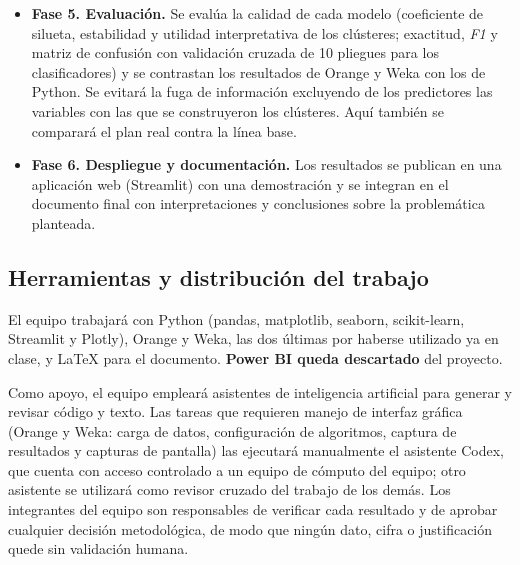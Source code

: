\documentclass[letterpaper,11pt]{article}
\begin{document}
\begin{itemize}
  \item \textbf{Fase 5. Evaluación.} Se evalúa la calidad de cada modelo (coeficiente de silueta, estabilidad y utilidad interpretativa de los clústeres; exactitud, \textit{F1} y matriz de confusión con validación cruzada de 10 pliegues para los clasificadores) y se contrastan los resultados de Orange y Weka con los de Python. Se evitará la fuga de información excluyendo de los predictores las variables con las que se construyeron los clústeres. Aquí también se comparará el plan real contra la línea base.
  \item \textbf{Fase 6. Despliegue y documentación.} Los resultados se publican en una aplicación web (Streamlit) con una demostración y se integran en el documento final con interpretaciones y conclusiones sobre la problemática planteada.
\end{itemize}

\subsection*{Herramientas y distribución del trabajo}

El equipo trabajará con Python (pandas, matplotlib, seaborn, scikit-learn, Streamlit y Plotly), Orange y Weka, las dos últimas por haberse utilizado ya en clase, y LaTeX para el documento. \textbf{Power BI queda descartado} del proyecto.

Como apoyo, el equipo empleará asistentes de inteligencia artificial para generar y revisar código y texto. Las tareas que requieren manejo de interfaz gráfica (Orange y Weka: carga de datos, configuración de algoritmos, captura de resultados y capturas de pantalla) las ejecutará manualmente el asistente Codex, que cuenta con acceso controlado a un equipo de cómputo del equipo; otro asistente se utilizará como revisor cruzado del trabajo de los demás. Los integrantes del equipo son responsables de verificar cada resultado y de aprobar cualquier decisión metodológica, de modo que ningún dato, cifra o justificación quede sin validación humana.
\end{document}
